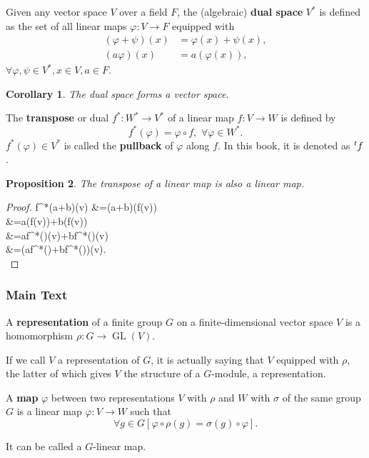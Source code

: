 \documentclass[12pt, letterpaper]{article}
\newcommand{\GL}{\operatorname{GL}}
\newenvironment{eqlong}{\equation\aligned}{\endaligned\endequation}
\newtheorem{prop}{Proposition}[section]
\newtheorem{cor}[prop]{Corollary}
\theoremstyle{definition}
\theoremstyle{remark}
\theoremstyle{definition}
\theoremstyle{plain}
\numberwithin{equation}{section}
\begin{document}
	\begin{def*}
		Given any vector space $V$ over a field $F$, the (algebraic) \textbf{dual space} $V^{*}$ is defined as the set of all linear maps $\varphi \colon V\to F$ equipped with
		\[\begin{aligned}(\varphi +\psi )(x)&=\varphi (x)+\psi (x),\\(a\varphi )(x)&=a\left(\varphi (x)\right),\end{aligned}\]
		$\forall \varphi ,\psi \in V^{*}, x\in V, a\in F$.
	\end{def*}
	\begin{cor}
		The dual space forms a vector space.
	\end{cor}
	\begin{def*}[transpose]
		The \textbf{transpose} or dual $f^*\colon W^*\to V^*$ of a linear map $f \colon V\to W$ is defined by
		\[f^*(\varphi)=\varphi\circ f,\,\, \forall \varphi \in W^*.\]
		$f^*(\varphi)\in V^*$ is called the \textbf{pullback} of $\varphi$ along $f$.
		In this book, it is denoted as $\tensor[^t]{f}{}$.
	\end{def*}

	\begin{prop}
	The transpose of a linear map is also a linear map.
	\end{prop}
	\begin{proof}
		\begin{eqlong}
			f^*(a\varphi+b\psi)(v)
			&=(a\varphi+b\psi)(f(v))\\
			&=a\varphi(f(v))+b\psi(f(v))\\
			&=af^*(\varphi)(v)+bf^*(\psi)(v)\\
			&=(af^*(\varphi)+bf^*(\psi))(v).\\
		\end{eqlong}
	\end{proof}

	\subsubsection{Main Text}
	\begin{def*}[representation]
		A \textbf{representation} of a finite group $G$ on a finite-dimensional vector 
		space $V$ is a homomorphism $\rho\colon G \to \GL(V)$.
	\end{def*}
	If we call $V$ a representation of $G$, it is actually saying that $V$ equipped with $\rho$,
	the latter of which gives $V$ the structure of a $G$-module,
	a representation.
	
	\begin{def*}
		A \textbf{map} $\varphi$ between two representations $V$ with $\rho$ and $W$ with $\sigma$ of the same group $G$
		is a linear map $\varphi \colon V \to W$ such that
		\[
		\forall g \in G
		[ \varphi \circ \rho(g) = \sigma(g) \circ \varphi ].
		\]
	\end{def*}
	It can be called a $G$-linear map.
	
\end{document}
